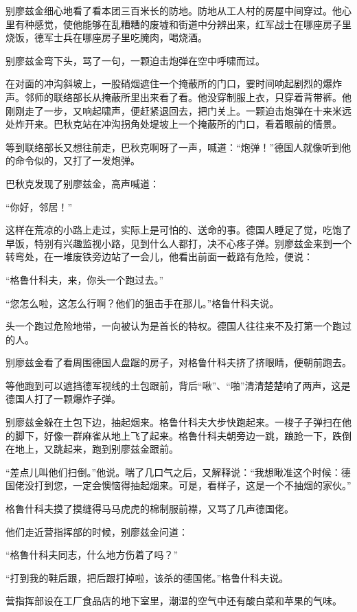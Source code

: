 别廖兹金细心地看了看本团三百米长的防地。防地从工人村的房屋中间穿过。他心里有种感觉，使他能够在乱糟糟的废墟和街道中分辨出来，红军战士在哪座房子里烧饭，德军士兵在哪座房子里吃腌肉，喝烧酒。

别廖兹金弯下头，骂了一句，一颗迫击炮弹在空中呼啸而过。

在对面的冲沟斜坡上，一股硝烟遮住一个掩蔽所的门口，霎时间响起剧烈的爆炸声。邻师的联络部长从掩蔽所里出来看了看。他没穿制服上衣，只穿着背带裤。他刚刚走了一步，又响起啸声，便赶紧退回去，把门关上。一颗迫击炮弹在十来米远处炸开来。巴秋克站在冲沟拐角处堤坡上一个掩蔽所的门口，看着眼前的情景。

等到联络部长又想往前走，巴秋克啊呀了一声，喊道：“炮弹！”德国人就像听到他的命令似的，又打了一发炮弹。

巴秋克发现了别廖兹金，高声喊道：

“你好，邻居！”

这样在荒凉的小路上走过，实际上是可怕的、送命的事。德国人睡足了觉，吃饱了早饭，特别有兴趣监视小路，见到什么人都打，决不心疼子弹。别廖兹金来到一个转弯处，在一堆废铁旁边站了一会儿，他看出前面一截路有危险，便说：

“格鲁什科夫，来，你头一个跑过去。”

“您怎么啦，这怎么行啊？他们的狙击手在那儿。”格鲁什科夫说。

头一个跑过危险地带，一向被认为是首长的特权。德国人往往来不及打第一个跑过的人。

别廖兹金看了看周围德国人盘踞的房子，对格鲁什科夫挤了挤眼睛，便朝前跑去。

等他跑到可以遮挡德军视线的土包跟前，背后“啾”、“啪”清清楚楚响了两声，这是德国人打了一颗爆炸子弹。

别廖兹金躲在土包下边，抽起烟来。格鲁什科夫大步快跑起来。一梭子子弹扫在他的脚下，好像一群麻雀从地上飞了起来。格鲁什科夫朝旁边一跳，踉跄一下，跌倒在地上，又跳起来，跑到别廖兹金跟前。

“差点儿叫他们扫倒。”他说。喘了几口气之后，又解释说：“我想瞅准这个时候：德国佬没打到您，一定会懊恼得抽起烟来。可是，看样子，这是一个不抽烟的家伙。”

格鲁什科夫摸了摸缝得马马虎虎的棉制服前襟，又骂了几声德国佬。

他们走近营指挥部的时候，别廖兹金问道：

“格鲁什科夫同志，什么地方伤着了吗？”

“打到我的鞋后跟，把后跟打掉啦，该杀的德国佬。”格鲁什科夫说。

营指挥部设在工厂食品店的地下室里，潮湿的空气中还有酸白菜和苹果的气味。

